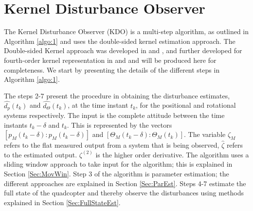 \documentclass[letterpaper%
, twoside%
, 12pt%
,memoire%
, english%
,creativecommons,hyperref%
]{thETS}
\begin{document}
\chapter{Kernel Disturbance Observer} \label{Chap:KDO}
The Kernel Disturbance Observer (KDO) is a multi-step algorithm, as outlined in Algorithm \ref{algo:1} and uses the double-sided kernel estimation approach. The Double-sided Kernel approach was developed in \citep{RN119} and \citep{RN76}, and further developed for fourth-order kernel representation in \citep{RN83} and \citep{RN120} and will be produced here for completeness. We start by presenting the details of the different steps in Algorithm \ref{algo:1}. 

The steps 2-7 present the procedure in obtaining the disturbance estimates, $\hat{d_p}(t_k)$ and $\hat{d_\Theta}(t_k)$, at the time instant $t_k$, for the positional and rotational systems respectively. The input is the complete attitude between the time instants $t_k-\delta$ and $t_k$. This is represented by the vectors $[p_M(t_k-\delta) : p_{M}(t_k-\delta)]$ and $[\Theta_M(t_k-\delta) : \Theta_M(t_k)]$. The variable $\zeta_M$ refers to the flat measured output from a system that is being observed, $\hat{\zeta}$ refers to the estimated output. ${\zeta}^{(2)}$ is the higher order derivative. The algorithm uses a sliding window approach to take input for the algorithm; this is explained in Section \ref{Sec:MovWin}. Step 3 of the algorithm is parameter estimation; the different approaches are explained in Section \ref{Sec:ParEst}. Steps 4-7 estimate the full state of the quadcopter and thereby observe the disturbances using methods explained in Section \ref{Sec:FullStateEst}.
\end{document}
